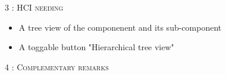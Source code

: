 \begin{flushleft}
    \BlackLine
    \textsc{\Large 3 : HCI needing}\\[0.3cm]

    \begin{itemize}
        \item A tree view of the componenent and its sub-component
        \item A toggable button "Hierarchical tree view"
    \end{itemize}

    \BlackLine
    \textsc{\Large 4 : Complementary remarks}\\[0.3cm]

\end{flushleft}
